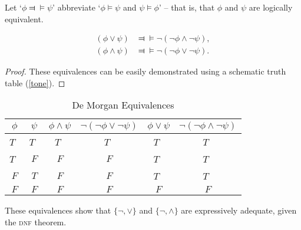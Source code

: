 Let `$\phi\Dashv\vDash\psi$' abbreviate `$\phi \vDash \psi$ and $\psi \vDash \phi$' – that is, that $\phi$ and $\psi$ are logically equivalent.
\begin{theorem}\label{demorg}
		\begin{align*}
			(\phi \vee \psi) &\Dashv\vDash \neg(\neg\phi \wedge \neg \psi),\\
	(\phi \wedge \psi) &\Dashv\vDash\neg(\neg\phi \vee \neg \psi).
		\end{align*}
\begin{proof}
	These equivalences can be easily demonstrated using a schematic truth table (\autoref{tone}). 
\end{proof}
\end{theorem} \begin{table}
    \centering
    \begin{tabular}{cc|cc|cc}
    \toprule
        $\phi$ & $\psi$ &$\phi \wedge \psi$ & $\neg(\neg \phi \vee \neg \psi)$ & $\phi \vee \psi$ & $\neg (\neg \phi \wedge \neg \psi)$\\
        \midrule    
    $T$\ & $T$\ & $T$\ & $T$\ & $T$\ & $T$\ \\
    $T$\ & $F$ & $F$& $F$ & $T$\ & $T$\  \\
    $F$ & $T$& $F$ &$F$ & $T$\ & $T$\ \\
    $F$ & $F$& $F$ & $F$& $F$& $F$\\
    \bottomrule
    \end{tabular}
\caption{De Morgan Equivalences\label{tone}}
\end{table}
These equivalences show that $\{\neg,\vee\}$ and $\{\neg,\wedge\}$ are expressively adequate, given the \textsc{\lowercase{DNF}} theorem.

